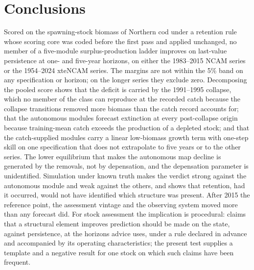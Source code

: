 \section{Conclusions}\label{sec:conclusions}

Scored on the spawning-stock biomass of Northern cod under a retention rule whose scoring core was coded before the first pass and applied unchanged, no member of a five-module surplus-production ladder improves on last-value persistence at one- and five-year horizons, on either the 1983--2015 NCAM series or the 1954--2024 xteNCAM series. The margins are not within the 5\% band on any specification or horizon; on the longer series they exclude zero. Decomposing the pooled score shows that the deficit is carried by the 1991--1995 collapse, which no member of the class can reproduce at the recorded catch because the collapse transitions removed more biomass than the catch record accounts for; that the autonomous modules forecast extinction at every post-collapse origin because training-mean catch exceeds the production of a depleted stock; and that the catch-supplied modules carry a linear low-biomass growth term with one-step skill on one specification that does not extrapolate to five years or to the other series. The lower equilibrium that makes the autonomous map decline is generated by the removals, not by depensation, and the depensation parameter is unidentified. Simulation under known truth makes the verdict strong against the autonomous module and weak against the others, and shows that retention, had it occurred, would not have identified which structure was present. After 2015 the reference point, the assessment vintage and the observing system moved more than any forecast did. For stock assessment the implication is procedural: claims that a structural element improves prediction should be made on the state, against persistence, at the horizons advice uses, under a rule declared in advance and accompanied by its operating characteristics; the present test supplies a template and a negative result for one stock on which such claims have been frequent.
